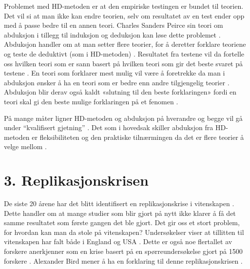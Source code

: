 \documentclass[
]{book}
\begin{document}
Problemet med HD-metoden er at den empiriske testingen er bundet til teorien. Det vil si at man ikke kan endre teorien, selv om resultatet av en test ender opp med å passe bedre til en annen teori. Charles Sanders Peirce sin teori om abduksjon i tillegg til induksjon og deduksjon kan løse dette problemet \citep{peirce1992}. Abduksjon handler om at man setter flere teorier, for å deretter forklare teoriene og teste de deduktivt (som i HD-metoden) \citep{peirce1992}. Resultatet fra testene vil da fortelle oss hvilken teori som er sann basert på hvilken teori som gir det beste svaret på testene \citep{peirce1992}. En teori som forklarer mest mulig vil være å foretrekke da man i abduksjon ønsker å ha en teori som er bedre enn andre tilgjengelig teorier \citep{peirce1992}. Abduksjon blir derav også kaldt «slutning til den beste forklaringen» fordi en teori skal gi den beste mulige forklaringen på et fenomen \citep{peirce1992}.

På mange måter ligner HD-metoden og abduksjon på hverandre og begge vil gå under ``kvalifisert gjetning'' \citep{persson2019}. Det som i hovedsak skiller abduksjon fra HD-metoden er fleksibiliteten og den praktiske tilnærmingen da det er flere teorier å velge mellom \citep{peirce1992}.

\hypertarget{replikasjonskrisen}{%
\section{3. Replikasjonskrisen}\label{replikasjonskrisen}}

De siste 20 årene har det blitt identifisert en replikasjonskrise i vitenskapen \citep{begley2012, ioannidis2005, opensciencecollaboration2015}. Dette handler om at mange studier som blir gjort på nytt ikke klarer å få det samme resultatet som første gangen det ble gjort. Det gir oss et stort problem, for hvordan kan man da stole på vitenskapen? Undersøkelser viser at tillitten til vitenskapen har falt både i England og USA \citep{funk2016}. Dette er også noe flertallet av forskere anerkjenner som en krise basert på en spørreundersøkelse gjort på 1500 forskere \citep{baker2016}. Alexander Bird mener å ha en forklaring til denne replikasjonskrisen \citep{bird2020}.
\end{document}
